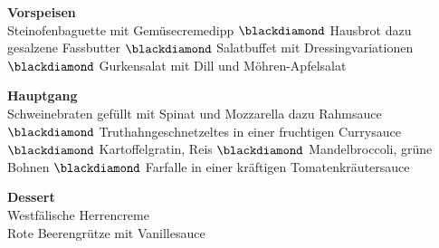 \Centering
\vspace{0.3em}
	\noindent \textbf{Vorspeisen}\\
	Steinofenbaguette mit Gemüsecremedipp $\blackdiamond$ Hausbrot dazu gesalzene Fassbutter $\blackdiamond$ 
	Salatbuffet mit Dressingvariationen $\blackdiamond$
	Gurkensalat mit Dill und Möhren-Apfelsalat
	
	\noindent \textbf{Hauptgang}\\
	Schweinebraten gefüllt mit Spinat und Mozzarella dazu Rahmsauce $\blackdiamond$
	Truthahngeschnetzeltes in einer fruchtigen Currysauce $\blackdiamond$
	Kartoffelgratin, Reis $\blackdiamond$
	Mandelbroccoli, grüne Bohnen $\blackdiamond$
	Farfalle in einer kräftigen Tomatenkräutersauce
	
	\noindent \textbf{Dessert}\\
	Westfälische Herrencreme \\
	Rote Beerengrütze mit Vanillesauce

\justifying



